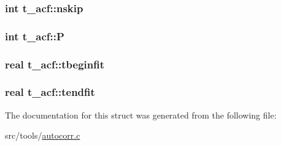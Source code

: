 \hypertarget{structt__acf_acdfd80db66ab81e382954239ca574bef}{
\subsubsection[{nskip}]{\setlength{\rightskip}{0pt plus 5cm}int {\bf t\-\_\-acf\-::nskip}}}\label{structt__acf_acdfd80db66ab81e382954239ca574bef}
\hypertarget{structt__acf_af965bb59c4df4c67df66a4c603db7aa9}{
\subsubsection[{\-P}]{\setlength{\rightskip}{0pt plus 5cm}int {\bf t\-\_\-acf\-::\-P}}}\label{structt__acf_af965bb59c4df4c67df66a4c603db7aa9}
\hypertarget{structt__acf_a849ecbef2ea6fcc67d85d0cd6984d9c5}{
\subsubsection[{tbeginfit}]{\setlength{\rightskip}{0pt plus 5cm}real {\bf t\-\_\-acf\-::tbeginfit}}}\label{structt__acf_a849ecbef2ea6fcc67d85d0cd6984d9c5}
\hypertarget{structt__acf_aad6bdd76f54c9a08ac9ba24a9df91a66}{
\subsubsection[{tendfit}]{\setlength{\rightskip}{0pt plus 5cm}real {\bf t\-\_\-acf\-::tendfit}}}\label{structt__acf_aad6bdd76f54c9a08ac9ba24a9df91a66}


\-The documentation for this struct was generated from the following file\-:\begin{DoxyCompactItemize}
\item 
src/tools/\hyperlink{autocorr_8c}{autocorr.\-c}\end{DoxyCompactItemize}
